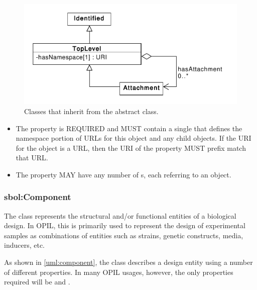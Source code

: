 \begin{figure}[ht]
\begin{center}
\includegraphics[scale=0.6]{sbol_uml/toplevel}
\caption[]{Classes that inherit from the  abstract class.}
\label{uml:toplevel}
\end{center}
\end{figure}

\begin{itemize}
\item \label{sec:sbol:hasNamespace}
The  property is REQUIRED and MUST contain a single  that defines the namespace portion of URLs for this object and any child objects.
If the URI for the  object is a URL, then the URI of the  property MUST prefix match that URL.

\item 
\label{sec:sbol:hasAttachment}
The  property MAY have any number of s, each referring to an  object.
\end{itemize}


\subsubsection{sbol:Component}
\label{sec:sbol:Component}

The  class represents the structural and/or functional entities of a biological design. 
In OPIL, this is primarily used to represent the design of experimental samples as combinations of entities such as strains, genetic constructs, media, inducers, etc.

As shown in \ref{uml:component}, the  class describes a design entity using a number of different properties.
In many OPIL usages, however, the only properties required will be  and .

